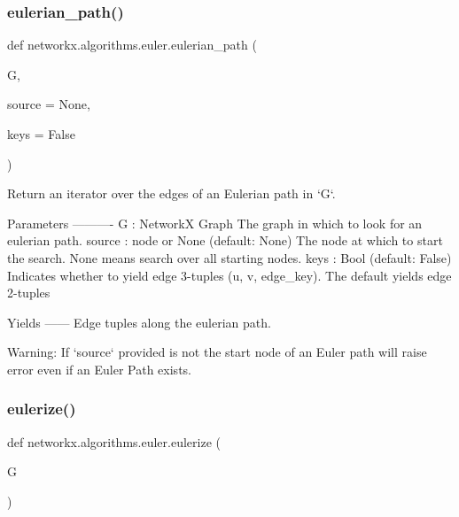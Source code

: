 \subsubsection{\texorpdfstring{eulerian\+\_\+path()}{eulerian\_path()}}
{\footnotesize\ttfamily def networkx.\+algorithms.\+euler.\+eulerian\+\_\+path (\begin{DoxyParamCaption}\item[{}]{G,  }\item[{}]{source = {\ttfamily None},  }\item[{}]{keys = {\ttfamily False} }\end{DoxyParamCaption})}

\begin{DoxyVerb}Return an iterator over the edges of an Eulerian path in `G`.

Parameters
----------
G : NetworkX Graph
    The graph in which to look for an eulerian path.
source : node or None (default: None)
    The node at which to start the search. None means search over all
    starting nodes.
keys : Bool (default: False)
    Indicates whether to yield edge 3-tuples (u, v, edge_key).
    The default yields edge 2-tuples

Yields
------
Edge tuples along the eulerian path.

Warning: If `source` provided is not the start node of an Euler path
will raise error even if an Euler Path exists.
\end{DoxyVerb}
 \mbox{\label{namespacenetworkx_1_1algorithms_1_1euler_a32cbff4ddffb583be6a229c494940f02}} 
\subsubsection{\texorpdfstring{eulerize()}{eulerize()}}
{\footnotesize\ttfamily def networkx.\+algorithms.\+euler.\+eulerize (\begin{DoxyParamCaption}\item[{}]{G }\end{DoxyParamCaption})}

